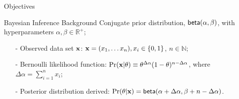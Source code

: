 \documentclass[final,hyperref={pdfpagelabels=false}]{beamer}
\begin{document}
\begin{frame}[t]
\begin{columns}[t]
\begin{column}{.485\textwidth}
\begin{block}{Objectives}

\end{block}

            
\begin{block}{Bayesian Inference Background}
Conjugate prior distribution, $\mathsf{beta}(\alpha, \beta)$, with hyperparameters $\alpha,\beta\in\mathbb{R}^{+}$;
\begin{itemize}
  \item[-] Observed data set $\textbf{x}$: $\textbf{x}= (x_1,\dots x_n), x_i\in\{0,1\}$, $n\in\mathbb{N}$;

  \item[-] Bernoulli likelihood function: $\Pr(\textbf{x} | \theta)\equiv \theta^{\Delta \alpha}(1-\theta)^{n - \Delta \alpha}$, where $\Delta \alpha = \displaystyle\sum_{i=1}^{n}x_i$;

  \item[-] Posterior distribution derived: $\Pr(\theta|\textbf{x})=\mathsf{beta}(\alpha + \Delta \alpha,\beta + n - \Delta \alpha)$.
\end{itemize}
\end{block}



\end{column}
\end{columns}
\end{frame}
\end{document}
